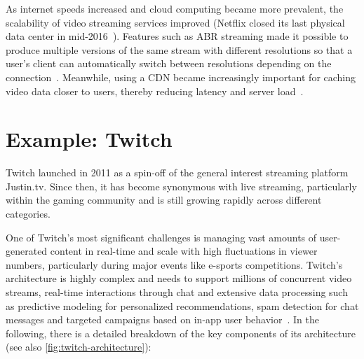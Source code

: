 \noindent As internet speeds increased and cloud computing became more prevalent, the scalability of video streaming services improved (Netflix closed its last physical data center in mid-2016~\parencite{netflix_cloud}).
Features such as \ac{ABR} streaming made it possible to produce multiple versions of the same stream with different resolutions so that a user's client can automatically switch between resolutions depending on the connection~\parencite{abr}. Meanwhile, using a \ac{CDN} became increasingly important for caching video data closer to users, thereby reducing latency and server load~\parencite{cdn_basic}.

\section{Example: Twitch}
Twitch launched in 2011 as a spin-off of the general interest streaming platform Justin.tv. Since then, it has become synonymous with live streaming, particularly within the gaming community and is still growing rapidly across different categories. 

One of Twitch's most significant challenges is managing vast amounts of user-generated content in real-time and scale with high fluctuations in viewer numbers, particularly during major events like e-sports competitions.
Twitch's architecture is highly complex and needs to support millions of concurrent video streams, real-time interactions through chat and extensive data processing such as predictive modeling for personalized recommendations, spam detection for chat messages and targeted campaigns based on in-app user behavior~\parencite{twitch_analytics}. In the following, there is a detailed breakdown of the key components of its architecture (see also \autoref{fig:twitch-architecture}):

